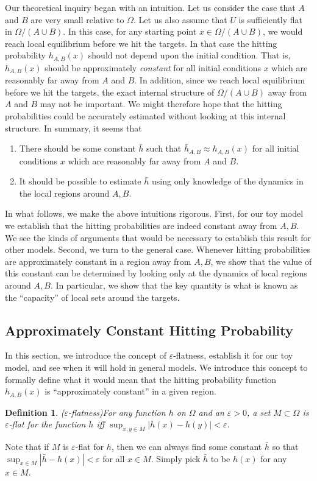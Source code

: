 \documentclass[english, aip, jcp, priprint, graphicx,floatfix]{revtex4-1}
\newtheorem{definition}{Definition}
\theoremstyle{plain}
\theoremstyle{definition}
\theoremstyle{plain}
\begin{document}
Our theoretical inquiry began with an intuition.  Let us consider the case that $A$ and $B$ are very small relative to $\Omega$.  Let us also assume that $U$ is sufficiently flat in $\Omega / (A\cup B)$.  In this case, for any starting point $x\in \Omega / (A\cup B)$, we would reach local equilibrium before we hit the targets.  In that case the hitting probability $h_{A, B}(x)$ should not depend upon the initial condition.  That is, $h_{A,B}(x)$ should be approximately \emph{constant} for all initial conditions $x$ which are reasonably far away from $A$ and $B$.  In addition, since we reach local equilibrium before we hit the targets, the exact internal structure of $\Omega / (A\cup B)$ away from $A$ and $B$ may not be important.  We might therefore hope that the hitting probabilities could be accurately estimated without looking at this internal structure.  In summary, it seems that
%
\begin{enumerate}
    \item There should be some constant $\bar h$ such that $\bar h_{A,B} \approx h_{A,B}(x)$ for all initial conditions $x$ which are reasonably far away from $A$ and $B$.
    \item It should be possible to estimate $\bar h$ using only knowledge of the dynamics in the local regions around $A,B$.  
\end{enumerate}
%
In what follows, we make the above intuitions rigorous.  First, for our toy model we establish that the hitting probabilities are indeed constant away from $A,B$.  We see the kinds of arguments that would be necessary to establish this result for other models.  Second, we turn to the general case.   Whenever hitting probabilities are approximately constant in a region away from $A,B$, we show that the value of this constant can be determined by looking only at the dynamics of local regions around $A,B$.  In particular, we show that the key quantity is what is known as the ``capacity'' of local sets around the targets. 

\subsection{Approximately Constant Hitting Probability}

In this section, we introduce the concept of $\varepsilon$-flatness, establish it for our toy model, and see when it will hold in general models.  We introduce this concept to formally define what it would mean that the hitting probability function $h_{A, B}(x)$ is ``approximately constant'' in a given region.
%
\begin{definition}($\varepsilon$-flatness)\label{def:epsilon_flat}
For any function $h$ on $\Omega$ and an $\varepsilon > 0$, a set $M\subset \Omega$ is $\varepsilon$-flat for the function $h$ iff $\sup_{x, y \in M} | h (x) - h (y) | < \varepsilon$.
\end{definition}
%
Note that if $M$ is $\varepsilon$-flat for $h$, then we can always find some constant $\bar h$ so that $\sup_{x \in M}|\bar h-h(x)|<\varepsilon$ for all $x\in M$.  Simply pick $\bar h$ to be $h(x)$ for any $x\in M$.  
\end{document}

